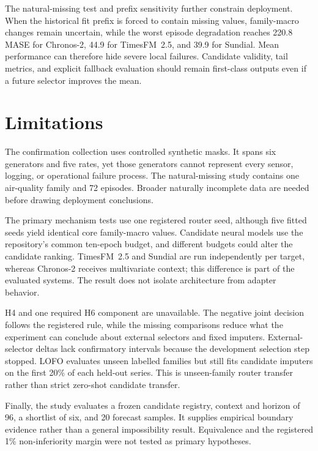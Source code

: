 \documentclass{article}
\begin{document}
The natural-missing test and prefix sensitivity further constrain deployment. When the historical fit prefix is forced to contain missing values, family-macro changes remain uncertain, while the worst episode degradation reaches 220.8 MASE for Chronos-2, 44.9 for TimesFM~2.5, and 39.9 for Sundial. Mean performance can therefore hide severe local failures. Candidate validity, tail metrics, and explicit fallback evaluation should remain first-class outputs even if a future selector improves the mean.

\section{Limitations}
\label{sec:limitations}

The confirmation collection uses controlled synthetic masks. It spans six generators and five rates, yet those generators cannot represent every sensor, logging, or operational failure process. The natural-missing study contains one air-quality family and 72 episodes. Broader naturally incomplete data are needed before drawing deployment conclusions.

The primary mechanism tests use one registered router seed, although five fitted seeds yield identical core family-macro values. Candidate neural models use the repository's common ten-epoch budget, and different budgets could alter the candidate ranking. TimesFM~2.5 and Sundial are run independently per target, whereas Chronos-2 receives multivariate context; this difference is part of the evaluated systems. The result does not isolate architecture from adapter behavior.

H4 and one required H6 component are unavailable. The negative joint decision follows the registered rule, while the missing comparisons reduce what the experiment can conclude about external selectors and fixed imputers. External-selector deltas lack confirmatory intervals because the development selection step stopped. LOFO evaluates unseen labelled families but still fits candidate imputers on the first 20\% of each held-out series. This is unseen-family router transfer rather than strict zero-shot candidate transfer.

Finally, the study evaluates a frozen candidate registry, context and horizon of 96, a shortlist of six, and 20 forecast samples. It supplies empirical boundary evidence rather than a general impossibility result. Equivalence and the registered 1\% non-inferiority margin were not tested as primary hypotheses.
\end{document}

